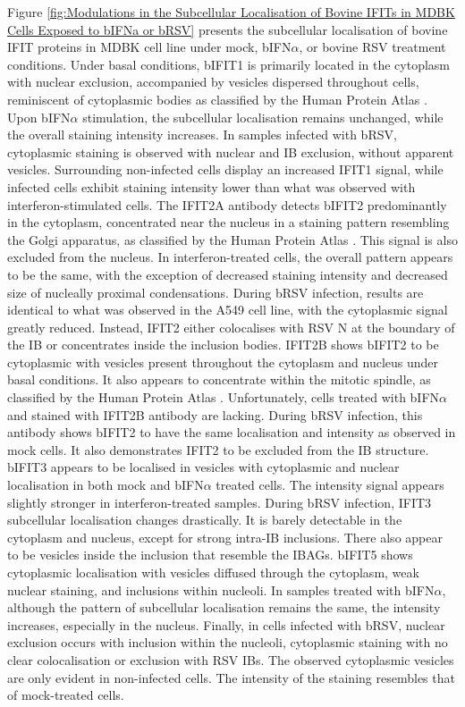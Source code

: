 Figure \ref{fig:Modulations in the Subcellular Localisation of Bovine IFITs in MDBK Cells Exposed to bIFNa or bRSV} presents the subcellular localisation of bovine IFIT proteins in MDBK cell line under mock, bIFN\(\alpha\), or bovine RSV treatment conditions. Under basal conditions, bIFIT1 is primarily located in the cytoplasm with nuclear exclusion, accompanied by vesicles dispersed throughout cells, reminiscent of cytoplasmic bodies as classified by the Human Protein Atlas \cite{Thul2017AProteome}. Upon bIFN\(\alpha\) stimulation, the subcellular localisation remains unchanged, while the overall staining intensity increases. In samples infected with bRSV, cytoplasmic staining is observed with nuclear and IB exclusion, without apparent vesicles. Surrounding non-infected cells display an increased IFIT1 signal, while infected cells exhibit staining intensity lower than what was observed with interferon-stimulated cells. The IFIT2A antibody detects bIFIT2 predominantly in the cytoplasm, concentrated near the nucleus in a staining pattern resembling the Golgi apparatus, as classified by the Human Protein Atlas \cite{Thul2017AProteome}. This signal is also excluded from the nucleus. In interferon-treated cells, the overall pattern appears to be the same, with the exception of decreased staining intensity and decreased size of nucleally proximal condensations. During bRSV infection, results are identical to what was observed in the A549 cell line, with the cytoplasmic signal greatly reduced. Instead, IFIT2 either colocalises with RSV N at the boundary of the IB or concentrates inside the inclusion bodies. IFIT2B shows bIFIT2 to be cytoplasmic with vesicles present throughout the cytoplasm and nucleus under basal conditions. It also appears to concentrate within the mitotic spindle, as classified by the Human Protein Atlas \cite{Thul2017AProteome}. Unfortunately, cells treated with bIFN\(\alpha\) and stained with IFIT2B antibody are lacking. During bRSV infection, this antibody shows bIFIT2 to have the same localisation and intensity as observed in mock cells. It also demonstrates IFIT2 to be excluded from the IB structure. bIFIT3 appears to be localised in vesicles with cytoplasmic and nuclear localisation in both mock and bIFN\(\alpha\) treated cells. The intensity signal appears slightly stronger in interferon-treated samples. During bRSV infection, IFIT3 subcellular localisation changes drastically. It is barely detectable in the cytoplasm and nucleus, except for strong intra-IB inclusions. There also appear to be vesicles inside the inclusion that resemble the IBAGs. bIFIT5 shows cytoplasmic localisation with vesicles diffused through the cytoplasm, weak nuclear staining, and inclusions within nucleoli. In samples treated with bIFN\(\alpha\), although the pattern of subcellular localisation remains the same, the intensity increases, especially in the nucleus. Finally, in cells infected with bRSV, nuclear exclusion occurs with inclusion within the nucleoli, cytoplasmic staining with no clear colocalisation or exclusion with RSV IBs. The observed cytoplasmic vesicles are only evident in non-infected cells. The intensity of the staining resembles that of mock-treated cells.

